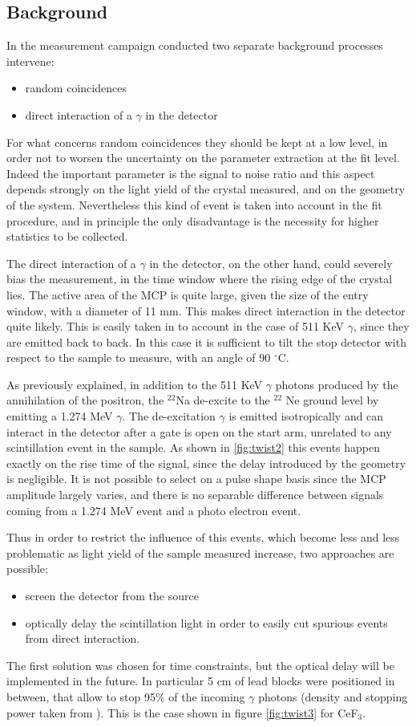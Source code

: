\subsection{Background}
In the measurement campaign conducted two separate background processes intervene:
\begin{itemize}
\item random coincidences
\item direct interaction of a $\gamma$ in the detector
\end{itemize}
For what concerns random coincidences they should be kept at a low level, in order not to worsen the uncertainty on the parameter extraction at the fit level. Indeed the important parameter is the signal to noise ratio and this aspect depends strongly on the light yield of the crystal measured, and on the geometry of the system. Nevertheless this kind of event is taken into account in the fit procedure, and in principle the only disadvantage is the necessity for higher statistics to be collected.

The direct interaction of a $\gamma$ in the detector, on the other hand, could severely bias the measurement, in the time window where the rising edge of the crystal lies. 
The active area of the MCP is quite large, given the size of the entry window, with a diameter of 11 mm. This makes direct interaction in the detector quite likely.
This is easily taken in to account in the case of 511 KeV $\gamma$, since they are emitted back to back. In this case it is sufficient to tilt the stop detector with respect to the sample to measure, with an angle of 90 $^{\circ}$C.

As previously explained, in addition to the 511 KeV $\gamma$ photons produced by the annihilation of the positron, the $^{22}$Na de-excite to the $^{22}$ Ne ground level by emitting a 1.274 MeV $\gamma$. 
The de-excitation $\gamma$ is emitted isotropically and can interact in the detector after a gate is open on the start arm, unrelated to any scintillation event in the sample.
As shown in \ref{fig:twist2} this events happen exactly on the rise time of the signal, since the delay introduced by the geometry is negligible.
It is not possible to select on a pulse shape basis since the MCP amplitude largely varies, and there is no separable difference between signals coming from a 1.274 MeV event and a photo electron event.

Thus in order to restrict the influence of this events, which become less and less problematic as light yield of the sample measured increase, two approaches are possible:
\begin{itemize}
\item screen the detector from the source
\item optically delay the scintillation light in order to easily cut spurious events from direct interaction.
\end{itemize}
The first solution was chosen for time constraints, but the optical delay will be implemented in the future. In particular 5 cm of lead blocks were positioned in between, that allow to stop 95$\%$ of the incoming $\gamma$ photons (density and stopping power taken from \cite{nist2005}). This is the case shown in figure \ref{fig:twist3} for CeF$_{3}$.

